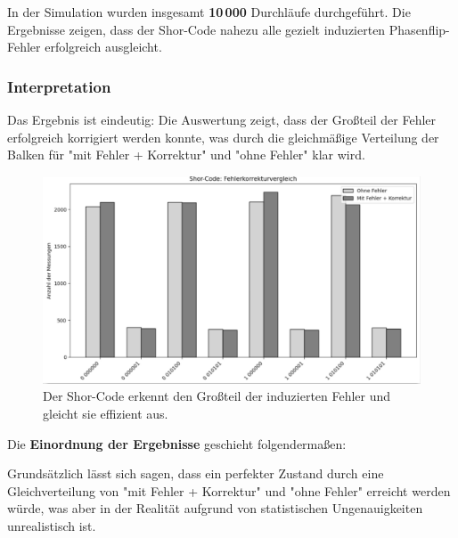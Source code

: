 In der Simulation wurden insgesamt \textbf{10\,000} Durchläufe durchgeführt. Die Ergebnisse zeigen, dass der Shor-Code nahezu alle gezielt induzierten Phasenflip-Fehler erfolgreich ausgleicht.


\subsubsection{Interpretation}
Das Ergebnis ist eindeutig: Die Auswertung zeigt, dass der Großteil der Fehler erfolgreich korrigiert werden konnte, was durch die gleichmäßige Verteilung der Balken für "mit Fehler + Korrektur" und "ohne Fehler" klar wird. 

\begin{figure}
    \centering
    \includegraphics[width=0.8\linewidth]{images/praxis-example/error-distribution.png}
    \caption{Der Shor-Code erkennt den Großteil der induzierten Fehler und gleicht sie effizient aus.}
    \label{fig:error-dist}
\end{figure}
\noindent
\medskip
Die \textbf{Einordnung der Ergebnisse} geschieht folgendermaßen: 

Grundsätzlich lässt sich sagen, dass ein perfekter Zustand durch eine Gleichverteilung von "mit Fehler + Korrektur" und "ohne Fehler" erreicht werden würde, was aber in der Realität aufgrund von statistischen Ungenauigkeiten unrealistisch ist.

